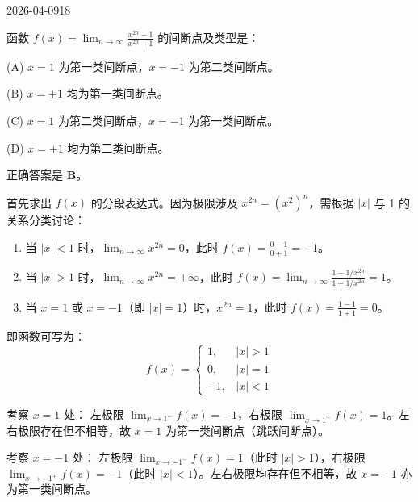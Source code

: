 \begin{mistake}{2026-04-09}{18}

\begin{problemcontent}
函数 \(\displaystyle f(x) = \lim_{n \to \infty} \frac{x^{2n}-1}{x^{2n}+1} \) 的间断点及类型是：

(A) \( x=1 \) 为第一类间断点，\( x=-1 \) 为第二类间断点。

(B) \( x=\pm 1 \) 均为第一类间断点。

(C) \( x=1 \) 为第二类间断点，\( x=-1 \) 为第一类间断点。

(D) \( x=\pm 1 \) 均为第二类间断点。
\end{problemcontent}

\begin{solutioncontent}
正确答案是 \textbf{B}。

首先求出 \(f(x)\) 的分段表达式。因为极限涉及 \(x^{2n} = (x^2)^n\)，需根据 \(|x|\) 与 1 的关系分类讨论：

\begin{enumerate}
 \item 当 \(|x| < 1\) 时，\(\lim_{n \to \infty} x^{2n} = 0\)，此时 \(f(x) = \frac{0 - 1}{0 + 1} = -1\)。
 \item 当 \(|x| > 1\) 时，\(\lim_{n \to \infty} x^{2n} = +\infty\)，此时 \(f(x) = \lim_{n \to \infty} \frac{1 - 1/x^{2n}}{1 + 1/x^{2n}} = 1\)。
 \item 当 \(x = 1\) 或 \(x = -1\)（即 \(|x|=1\)）时，\(x^{2n} = 1\)，此时 \(f(x) = \frac{1 - 1}{1 + 1} = 0\)。
\end{enumerate}

即函数可写为：
\[
f(x) = \begin{cases} 
1, & |x| > 1 \\ 
0, & |x| = 1 \\ 
-1, & |x| < 1 
\end{cases}
\]

考察 \(x = 1\) 处：
左极限 \(\lim_{x \to 1^-} f(x) = -1\)，右极限 \(\lim_{x \to 1^+} f(x) = 1\)。左右极限存在但不相等，故 \(x = 1\) 为第一类间断点（跳跃间断点）。

考察 \(x = -1\) 处：
左极限 \(\lim_{x \to -1^-} f(x) = 1\)（此时 \(|x| > 1\)），右极限 \(\lim_{x \to -1^+} f(x) = -1\)（此时 \(|x| < 1\)）。左右极限均存在但不相等，故 \(x = -1\) 亦为第一类间断点。
\end{solutioncontent}


\end{mistake}
